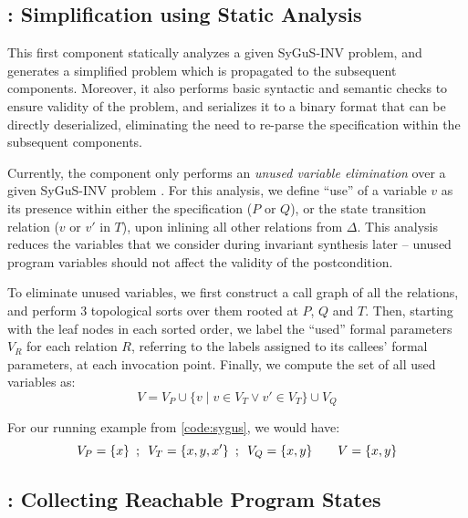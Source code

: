 \documentclass[conference]{IEEEtran}
\begin{document}
\subsection{\Process: Simplification using Static Analysis} \label{subsec:Process}

\noindent
This first component statically analyzes a given SyGuS-INV problem,
and generates a simplified problem which is propagated to the subsequent components.
Moreover, it also performs basic syntactic and semantic checks to ensure validity of the problem,
and serializes it to a binary format that can be directly deserialized,
eliminating the need to re-parse the specification within the subsequent components.

Currently, the \Process component only performs an
\emph{unused variable elimination} over a given SyGuS-INV problem \SyGuSINVTriplet.
For this analysis, we define ``use'' of a variable $v$ as its presence within either the specification ($P$ or $Q$),
or the state transition relation ($v$ or $v'$ in $T$), upon inlining all other relations from $\Delta$.
This analysis reduces the variables that we consider during invariant synthesis later --
unused program variables should not affect the validity of the postcondition.

To eliminate unused variables, we first construct a call graph of all the relations,
and perform 3 topological sorts over them rooted at $P$, $Q$ and $T$.
Then, starting with the leaf nodes in each sorted order, we label the ``used'' formal parameters $V_R$ for each relation $R$,
referring to the labels assigned to its callees' formal parameters, at each invocation point.
Finally, we compute the set of all used variables as:
$$
    V = V_P \cup \{ v \mid v \in V_T \vee v' \in V_T \} \cup V_Q
$$

For our running example from \cref{code:sygus}, we would have:
$$
    V_P = \{ x \} \enskip;\enskip V_T = \{ x, y, x' \} \enskip;\enskip V_Q = \{ x, y \} \qquad V = \{ x, y \}
$$

\subsection{\Record: Collecting Reachable Program States} \label{subsec:Record}
\end{document}
